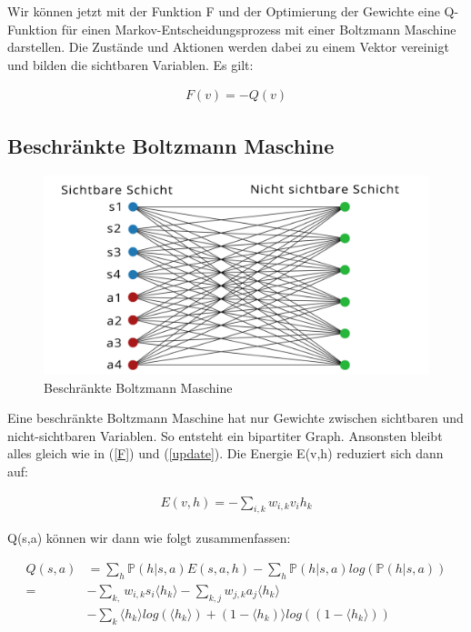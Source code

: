 Wir können jetzt mit der Funktion F und der Optimierung der Gewichte eine Q-Funktion für einen Markov-Entscheidungsprozess mit einer Boltzmann Maschine darstellen. Die Zustände und Aktionen werden dabei zu einem Vektor vereinigt und bilden die sichtbaren Variablen. Es gilt:

\begin{align}
	F(v) = - Q(v)
\end{align}

\subsection{Beschränkte Boltzmann Maschine}
\label{subsec:rbm}

\begin{figure}[hbt!]
\centering
\includegraphics[width=\textwidth]{Figures/rbm.png}
\caption{Beschränkte Boltzmann Maschine}
\label{police}
\end{figure}

Eine beschränkte Boltzmann Maschine hat nur Gewichte zwischen sichtbaren und nicht-sichtbaren Variablen. So entsteht ein bipartiter Graph. Ansonsten bleibt alles gleich wie in (\ref{F}) und (\ref{update}). Die Energie E(v,h) reduziert sich dann auf:

\begin{align}
	E(v,h) = - \sum_{i,k}w_{i,k}v_ih_k
\end{align}

Q(s,a) können wir dann wie folgt zusammenfassen:

\begin{align*}
	Q(s,a) 	&= \sum_{h}\mathbb{P}(h|s,a)E(s,a,h) - \sum_{h}\mathbb{P}(h|s,a)log(\mathbb{P}(h|s,a))  \\
		=  	&- \sum_{k, } w_{i,k}s_i \langle h_k \rangle - \sum_{k,j} w_{j,k}a_j \langle h_k \rangle  \\
			&- \sum_{k} \langle h_k \rangle log(\langle h_k \rangle) + (1 -  \langle h_k) \rangle log( (1 - \langle h_k \rangle) ) 
\end{align*}

